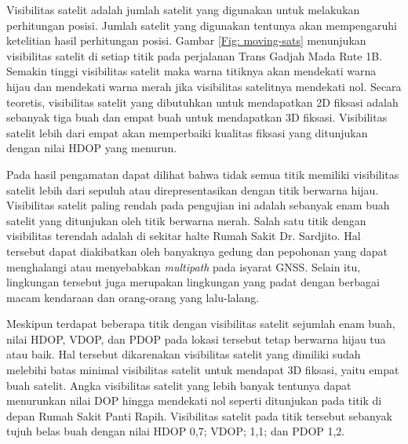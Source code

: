 Visibilitas satelit adalah jumlah satelit yang digunakan untuk melakukan perhitungan posisi. Jumlah satelit yang digunakan tentunya akan mempengaruhi ketelitian hasil perhitungan posisi. Gambar \ref{Fig: moving-sats} menunjukan visibilitas satelit di setiap titik pada perjalanan Trans Gadjah Mada Rute 1B. Semakin tinggi visibilitas satelit maka warna titiknya akan mendekati warna hijau dan mendekati warna merah jika visibilitas satelitnya mendekati nol. Secara teoretis, visibilitas satelit yang dibutuhkan untuk mendapatkan 2D fiksasi adalah sebanyak tiga buah dan empat buah untuk mendapatkan 3D fiksasi. Visibilitas satelit lebih dari empat akan memperbaiki kualitas fiksasi yang ditunjukan dengan nilai HDOP yang menurun. 

Pada hasil pengamatan dapat dilihat bahwa tidak semua titik memiliki visibilitas satelit lebih dari sepuluh atau direpresentasikan dengan titik berwarna hijau. Visibilitas satelit paling rendah pada pengujian ini adalah sebanyak enam buah satelit yang ditunjukan oleh titik berwarna merah. Salah satu titik dengan visibilitas terendah adalah di sekitar halte Rumah Sakit Dr. Sardjito. Hal tersebut dapat diakibatkan oleh banyaknya gedung dan pepohonan yang dapat menghalangi atau menyebabkan \textit{multipath} pada isyarat GNSS. Selain itu, lingkungan tersebut juga merupakan lingkungan yang padat dengan berbagai macam kendaraan dan orang-orang yang lalu-lalang.

Meskipun terdapat beberapa titik dengan visibilitas satelit sejumlah enam buah, nilai HDOP, VDOP, dan PDOP pada lokasi tersebut tetap berwarna hijau tua atau baik. Hal tersebut dikarenakan visibilitas satelit yang dimiliki sudah melebihi batas minimal visibilitas satelit untuk mendapat 3D fiksasi, yaitu empat buah satelit. Angka visibilitas satelit yang lebih banyak tentunya dapat menurunkan nilai DOP hingga mendekati nol seperti ditunjukan pada titik di depan Rumah Sakit Panti Rapih. Visibilitas satelit pada titik tersebut sebanyak tujuh belas buah dengan nilai HDOP 0,7; VDOP; 1,1; dan PDOP 1,2.